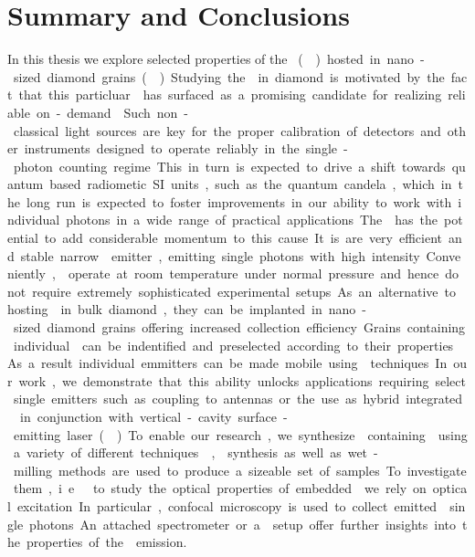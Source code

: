 

 \chapter*{Summary and Conclusions}	\label{ch::conclusion}

   In this thesis we explore selected properties of the \si \cc (\siv) hosted in nano-sized diamond grains (\nds). Studying the \sivc in diamond is motivated by the fact that this particluar \cc has surfaced as a promising candidate for realizing reliable on-demand \spss. Such non-classical light sources are key for the proper calibration of detectors and other instruments designed to operate reliably in the single-photon counting regime. This in turn is expected to drive a shift towards quantum based radiometic SI units, such as the quantum candela, which in the long run is expected to foster improvements in our ability to work with individual photons in a wide range of practical applications.

   The \siv has the potential to add considerable momentum to this cause. It is are very efficient and stable narrow \lw emitter, emitting single photons with high intensity. Conveniently, \sivs operate at room temperature under normal pressure and hence do not require extremely sophisticated experimental setups. As an alternative to hosting \sivs in bulk diamond, they can be implanted in nano-sized diamond grains offering increased collection efficiency. Grains containing individual \sivs can be indentified and preselected according to their properties. As a result individual emmitters can be made mobile using \pp techniques. In our work, we demonstrate that this ability unlocks applications requiring select single emitters such as coupling to antennas or the use as hybrid integrated \spss in conjunction with vertical-cavity surface-emitting laser (\VCSEL).

   To enable our research, we synthesize \nds containing \sivs using a variety of different techniques. \Cvd, \hpht synthesis as well as wet-milling methods are used to produce a sizeable set of samples. To investigate them, i.e\ to study the optical properties of embedded \sivs we rely on optical excitation. In particular, confocal microscopy is used to collect emitted \fl single photons. An attached spectrometer or a \HBT setup offer further insights into the properties of the \fl emission.

